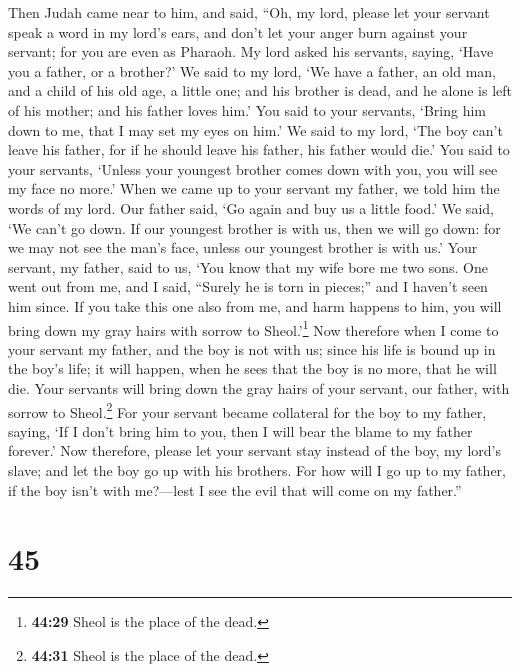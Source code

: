  Then Judah came near to him, and said, ``Oh, my lord,
please let your servant speak a word in my lord's ears, and don't let
your anger burn against your servant; for you are even as Pharaoh.
 My lord asked his servants, saying, `Have you a father,
or a brother?'  We said to my lord, `We have a father, an
old man, and a child of his old age, a little one; and his brother is
dead, and he alone is left of his mother; and his father loves him.'
 You said to your servants, `Bring him down to me, that I
may set my eyes on him.'  We said to my lord, `The boy
can't leave his father, for if he should leave his father, his father
would die.'  You said to your servants, `Unless your
youngest brother comes down with you, you will see my face no more.'
 When we came up to your servant my father, we told him
the words of my lord.  Our father said, `Go again and buy
us a little food.'  We said, `We can't go down. If our
youngest brother is with us, then we will go down: for we may not see
the man's face, unless our youngest brother is with us.' 
Your servant, my father, said to us, `You know that my wife bore me two
sons.  One went out from me, and I said, ``Surely he is
torn in pieces;'' and I haven't seen him since.  If you
take this one also from me, and harm happens to him, you will bring down
my gray hairs with sorrow to Sheol.'\footnote{\textbf{44:29} Sheol is
  the place of the dead.}  Now therefore when I come to
your servant my father, and the boy is not with us; since his life is
bound up in the boy's life;  it will happen, when he sees
that the boy is no more, that he will die. Your servants will bring down
the gray hairs of your servant, our father, with sorrow to
Sheol.\footnote{\textbf{44:31} Sheol is the place of the dead.}
 For your servant became collateral for the boy to my
father, saying, `If I don't bring him to you, then I will bear the blame
to my father forever.'  Now therefore, please let your
servant stay instead of the boy, my lord's slave; and let the boy go up
with his brothers.  For how will I go up to my father, if
the boy isn't with me?---lest I see the evil that will come on my
father.''

\hypertarget{section-44}{%
\section{45}\label{section-44}}

